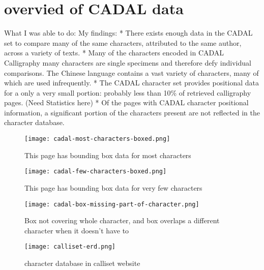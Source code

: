 \chapter{overvied of CADAL data}
What I was able to do:
    My findings:
        * There exists enough data in the CADAL set to compare many of the same characters, attributed to the same author, across a variety of texts.
        *  Many of the characters encoded in CADAL Calligraphy many characters are single specimens and therefore defy individual comparisons.  The Chinese language contains a vast variety of characters, many of which are used infrequently.
        *  The CADAL character set provides positional data for a only a very small portion: probably less than 10\% of retrieved calligraphy pages.  (Need Statistics here)
        *  Of the pages with CADAL character positional information, a significant portion of the characters present are not reflected in the character database.
    
    \begin{figure}{}
    \parbox{12cm}{\texttt{[image: cadal-most-characters-boxed.png]}}
    \caption{This page has bounding box data for most characters}
    \label{cadal most characters boxed}
    \end{figure}
    
    \begin{figure}{}
    \parbox{12cm}{\texttt{[image: cadal-few-characters-boxed.png]}}
    \caption{This page has bounding box data for very few characters}
    \label{cadal less characters boxed}
    \end{figure}
    
    \begin{figure}{}
    \parbox{12cm}{\texttt{[image: cadal-box-missing-part-of-character.png]}}
    \caption{Box not covering whole character, and box overlaps a different character when it doesn't have to}
    \label{cadal single character examples}
    \end{figure}
    
    \begin{figure}{}
    \parbox{12cm}{\texttt{[image: calliset-erd.png]}}
    \caption{character database in calliset website}
    \label{character database in calliset website}
    \end{figure}
    
